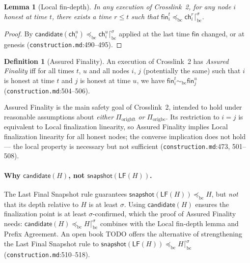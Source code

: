 \documentclass[11pt,a4paper]{article}
\newtheorem{lemma}[theorem]{Lemma}
\theoremstyle{definition}
\newtheorem{definition}[theorem]{Definition}
\begin{document}
\begin{lemma}[Local fin-depth]\label{lem:xl-fin-depth}
In any execution of Crosslink~2, for any node $i$ honest at time $t$,
there exists a time $r \le t$ such that $\mathsf{fin}_i^t
\preceq_{\mathrm{bc}} \mathsf{ch}_i^r \lceil^{\sigma}_{\mathrm{bc}}$.
\end{lemma}
\begin{proof}
By $\mathsf{candidate}(\mathsf{ch}_i^u) \preceq_{\mathrm{bc}}
\mathsf{ch}_i^u \lceil^{\sigma}_{\mathrm{bc}}$ applied at the last time
$\mathsf{fin}$ changed, or at genesis
(\texttt{construction.md}:490--495).
\end{proof}

\begin{definition}[Assured Finality]\label{def:xl-assured-finality}
An execution of Crosslink~2 has \emph{Assured Finality} iff for all times
$t$, $u$ and all nodes $i$, $j$ (potentially the same) such that $i$ is
honest at time $t$ and $j$ is honest at time $u$, we have $\mathsf{fin}_i^t
\sim_{\mathrm{bc}} \mathsf{fin}_j^u$ (\texttt{construction.md}:504--506).
\end{definition}

Assured Finality is the main safety goal of Crosslink~2, intended to hold
under reasonable assumptions about \emph{either} $\Pi_{\mathrm{origbft}}$
\emph{or} $\Pi_{\mathrm{origbc}}$. Its restriction to $i = j$ is
equivalent to Local finalization linearity, so Assured Finality implies
Local finalization linearity for all honest nodes; the converse
implication does not hold --- the local property is necessary but not
sufficient (\texttt{construction.md}:473, 501--508).

\paragraph{Why $\mathsf{candidate}(H)$, not
$\mathsf{snapshot}(\mathsf{LF}(H))$.} The Last Final Snapshot rule
guarantees $\mathsf{snapshot}(\mathsf{LF}(H)) \preceq_{\mathrm{bc}} H$,
but \emph{not} that its depth relative to $H$ is at least $\sigma$. Using
$\mathsf{candidate}(H)$ ensures the finalization point is at least
$\sigma$-confirmed, which the proof of Assured Finality needs:
$\mathsf{candidate}(H) \preceq_{\mathrm{bc}} H
\lceil^{\sigma}_{\mathrm{bc}}$ combines with the Local fin-depth lemma
and Prefix Agreement. An open book TODO offers the alternative of
strengthening the Last Final Snapshot rule to
$\mathsf{snapshot}(\mathsf{LF}(H)) \preceq_{\mathrm{bc}} H
\lceil^{\sigma}_{\mathrm{bc}}$ (\texttt{construction.md}:510--518).
\end{document}
